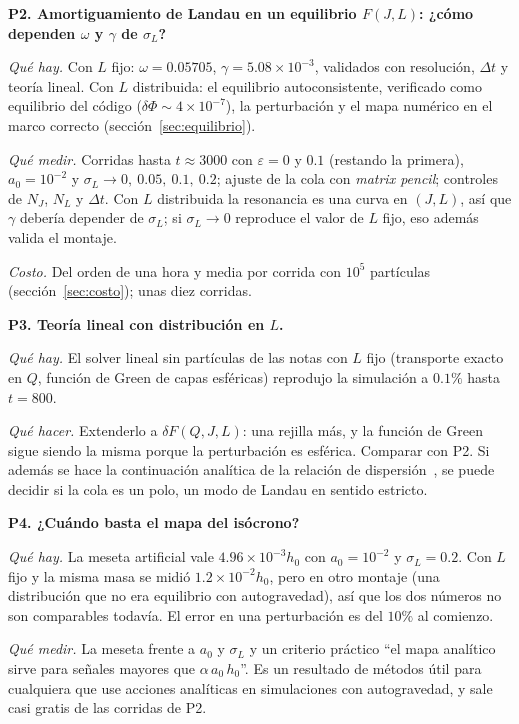\documentclass[11pt,a4paper]{article}
\begin{document}
\begin{pregunta}
\textbf{P2. Amortiguamiento de Landau en un equilibrio $F(J,L)$: ¿cómo dependen
$\omega$ y $\gamma$ de $\sigma_L$?}

\emph{Qué hay.} Con $L$ fijo: $\omega=0.05705$, $\gamma=5.08\times10^{-3}$, validados con
resolución, $\Delta t$ y teoría lineal. Con $L$ distribuida: el equilibrio
autoconsistente, verificado como equilibrio del código ($\delta\Phi\sim4\times10^{-7}$), la
perturbación y el mapa numérico en el marco correcto (sección~\ref{sec:equilibrio}).

\emph{Qué medir.} Corridas hasta $t\approx3000$ con $\varepsilon=0$ y $0.1$ (restando la
primera), $a_0=10^{-2}$ y $\sigma_L\to0,\ 0.05,\ 0.1,\ 0.2$; ajuste de la cola con
\emph{matrix pencil}; controles de $N_J$, $N_L$ y $\Delta t$. Con $L$ distribuida la
resonancia es una curva en $(J,L)$, así que $\gamma$ debería depender de $\sigma_L$; si
$\sigma_L\to0$ reproduce el valor de $L$ fijo, eso además valida el montaje.

\emph{Costo.} Del orden de una hora y media por corrida con $10^5$ partículas
(sección~\ref{sec:costo}); unas diez corridas.
\end{pregunta}

\begin{pregunta}
\textbf{P3. Teoría lineal con distribución en $L$.}

\emph{Qué hay.} El solver lineal sin partículas de las notas con $L$ fijo (transporte
exacto en $Q$, función de Green de capas esféricas) reprodujo la simulación a $0.1\%$
hasta $t=800$.

\emph{Qué hacer.} Extenderlo a $\delta F(Q,J,L)$: una rejilla más, y la función de Green
sigue siendo la misma porque la perturbación es esférica. Comparar con P2. Si además se
hace la continuación analítica de la relación de dispersión~\cite{fouvry2022}, se puede
decidir si la cola es un polo, un modo de Landau en sentido estricto.
\end{pregunta}

\begin{pregunta}
\textbf{P4. ¿Cuándo basta el mapa del isócrono?}

\emph{Qué hay.} La meseta artificial vale $4.96\times10^{-3}h_0$ con $a_0=10^{-2}$ y
$\sigma_L=0.2$. Con $L$ fijo y la misma masa se midió $1.2\times10^{-2}h_0$, pero en otro
montaje (una distribución que no era equilibrio con autogravedad), así que los dos números
no son comparables todavía. El error en una perturbación es del $10\%$ al comienzo.

\emph{Qué medir.} La meseta frente a $a_0$ y $\sigma_L$ y un criterio práctico ``el mapa
analítico sirve para señales mayores que $\alpha\,a_0\,h_0$''. Es un resultado de métodos
útil para cualquiera que use acciones analíticas en simulaciones con autogravedad, y sale
casi gratis de las corridas de P2.
\end{pregunta}
\end{document}
